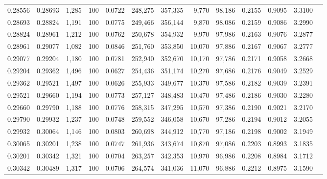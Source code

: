 \begin{tabular}{rrrrrrrrrrrrr}
0.28556 & 0.28693 & 1,285 & 100 &                                     0.0722 & 248,275 & 357,335 &   9,770 &  98,186 & 0.2155 & 0.9095 & 3.3100 \\
0.28693 & 0.28824 & 1,191 & 100 &                                     0.0775 & 249,466 & 356,144 &   9,870 &  98,086 & 0.2159 & 0.9086 & 3.2990 \\
0.28824 & 0.28961 & 1,212 & 100 &                                     0.0762 & 250,678 & 354,932 &   9,970 &  97,986 & 0.2163 & 0.9076 & 3.2877 \\
0.28961 & 0.29077 & 1,082 & 100 &                                     0.0846 & 251,760 & 353,850 &  10,070 &  97,886 & 0.2167 & 0.9067 & 3.2777 \\
0.29077 & 0.29204 & 1,180 & 100 &                                     0.0781 & 252,940 & 352,670 &  10,170 &  97,786 & 0.2171 & 0.9058 & 3.2668 \\
0.29204 & 0.29362 & 1,496 & 100 &                                     0.0627 & 254,436 & 351,174 &  10,270 &  97,686 & 0.2176 & 0.9049 & 3.2529 \\
0.29362 & 0.29521 & 1,497 & 100 &                                     0.0626 & 255,933 & 349,677 &  10,370 &  97,586 & 0.2182 & 0.9039 & 3.2391 \\
0.29521 & 0.29660 & 1,194 & 100 &                                     0.0773 & 257,127 & 348,483 &  10,470 &  97,486 & 0.2186 & 0.9030 & 3.2280 \\
0.29660 & 0.29790 & 1,188 & 100 &                                     0.0776 & 258,315 & 347,295 &  10,570 &  97,386 & 0.2190 & 0.9021 & 3.2170 \\
0.29790 & 0.29932 & 1,237 & 100 &                                     0.0748 & 259,552 & 346,058 &  10,670 &  97,286 & 0.2194 & 0.9012 & 3.2055 \\
0.29932 & 0.30064 & 1,146 & 100 &                                     0.0803 & 260,698 & 344,912 &  10,770 &  97,186 & 0.2198 & 0.9002 & 3.1949 \\
0.30065 & 0.30201 & 1,238 & 100 &                                     0.0747 & 261,936 & 343,674 &  10,870 &  97,086 & 0.2203 & 0.8993 & 3.1835 \\
0.30201 & 0.30342 & 1,321 & 100 &                                     0.0704 & 263,257 & 342,353 &  10,970 &  96,986 & 0.2208 & 0.8984 & 3.1712 \\
0.30342 & 0.30489 & 1,317 & 100 &                                     0.0706 & 264,574 & 341,036 &  11,070 &  96,886 & 0.2212 & 0.8975 & 3.1590 \\

\end{tabular}

